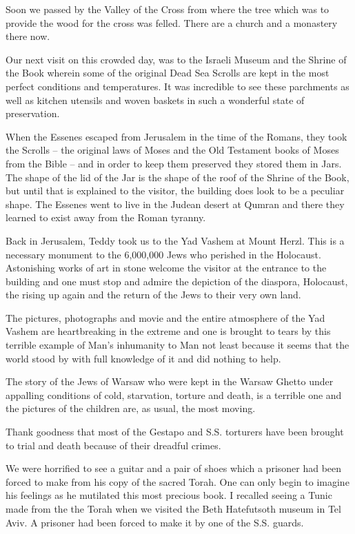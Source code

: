 Soon we passed by the Valley of the Cross from where the tree which
was to provide the wood for the cross was felled. There are a church
and a monastery there now.

Our next visit on this crowded day, was to the Israeli Museum and the
Shrine of the Book wherein some of the original Dead Sea Scrolls are
kept in the most perfect conditions and temperatures. It was
incredible to see these parchments as well as kitchen utensils and
woven baskets in such a wonderful state of preservation.

When the Essenes escaped from Jerusalem in the time of the Romans,
they took the Scrolls -- the original laws of Moses and the Old
Testament books of Moses from the Bible -- and in order to keep them
preserved they stored them in Jars. The shape of the lid of the Jar is
the shape of the roof of the Shrine of the Book, but until that is
explained to the visitor, the building does look to be a peculiar
shape. The Essenes went to live in the Judean desert at Qumran and
there they learned to exist away from the Roman tyranny.

Back in Jerusalem, Teddy took us to the Yad Vashem at Mount
Herzl. This is a necessary monument to the 6,000,000 Jews who perished
in the Holocaust. Astonishing works of art in stone welcome the
visitor at the entrance to the building and one must stop and admire
the depiction of the diaspora, Holocaust, the rising up again and the
return of the Jews to their very own land.

The pictures, photographs and movie and the entire atmosphere of the
Yad Vashem are heartbreaking in the extreme and one is brought to
tears by this terrible example of Man's inhumanity to Man not least
because it seems that the world stood by with full knowledge of it and
did nothing to help.

The story of the Jews of Warsaw who were kept in the Warsaw Ghetto
under appalling conditions of cold, starvation, torture and death, is
a terrible one and the pictures of the children are, as usual, the
most moving.

Thank goodness that most of the Gestapo and S.S. torturers have been
brought to trial and death because of their dreadful crimes.

We were horrified to see a guitar and a pair of shoes which a prisoner
had been forced to make from his copy of the sacred Torah. One can
only begin to imagine his feelings as he mutilated this most precious
book. I recalled seeing a Tunic made from the the Torah when we
visited the Beth Hatefutsoth museum in Tel Aviv. A prisoner had been
forced to make it by one of the S.S. guards.

